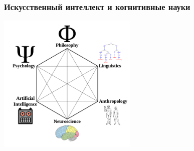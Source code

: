 \documentclass[default]{beamer}
\begin{document}
	\begin{frame}
		\frametitle{Искусственный интеллект и когнитивные науки}
		
		\centering
		\includegraphics[width=0.5\textwidth]{cogsci.png}
	\end{frame}
	
\end{document}

